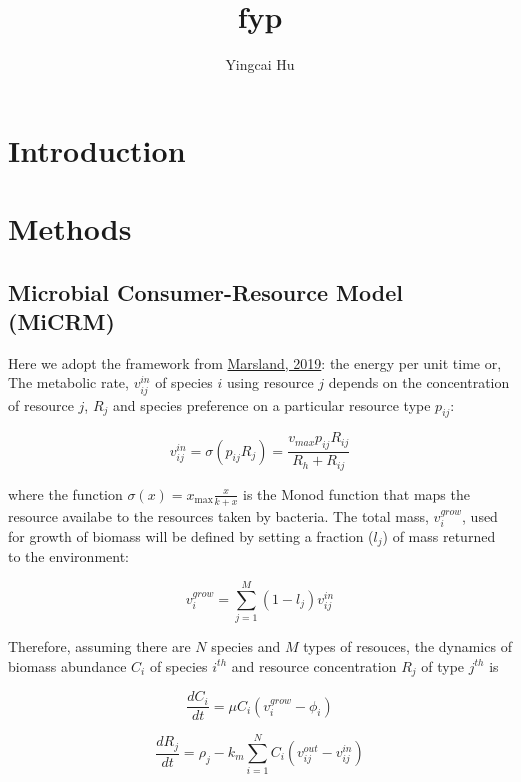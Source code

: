 \documentclass{article}
\title{fyp}
\author{Yingcai Hu}
\begin{document}
\maketitle

\section{Introduction}

\section{Methods}
\subsection{Microbial Consumer-Resource Model (MiCRM)}

Here we adopt the framework from \href{https://journals.plos.org/ploscompbiol/articleid=10.1371/journal.pcbi.1006793}{Marsland, 2019}: the energy per unit time or, The metabolic rate, $v^{in}_{ij}$ of species $i$ using resource $j$ depends on the concentration of resource $j$, $R_j$ and species preference on a particular resource type $p_{ij}$:

\begin{equation}
    v^{in}_{ij} =  \sigma(p_{ij} R_j) = \frac{v_{max}p_{ij}R_{ij}}{R_h + R_{ij}}
\end{equation}


where the function $\sigma(x) = x_{\max} \frac{x}{k + x}$ is the Monod function that maps the resource availabe to the resources taken by bacteria. The total mass, $ v^{grow}_i $, used for growth of biomass will be defined by setting a fraction ($l_{j}$) of mass returned to the environment:

\begin{equation}
    v^{grow}_{i} = \sum^M_{j=1} (1-l_{j}) v^{in}_{ij}
\end{equation}

Therefore, assuming there are $N$ species and $M$ types of resouces,
the dynamics of biomass abundance $C_i$ of species $i^{th}$ and resource concentration $R_j$ of type $j^{th}$  is

\begin{equation} 
    \frac{dC_i}{dt} = \mu C_i  ( v^{grow}_i  - \phi_i )
\end{equation}

 \begin{equation}
    \frac{dR_j}{dt} = \rho_j - k_{m} \sum^N_{i=1} C_i (v^{out}_{ij} - v^{in}_{ij})
 \end{equation}
\end{document}
